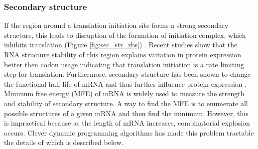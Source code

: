 \subsubsection{Secondary structure}
If the region around a translation initiation site forms a strong secondary structure, this leads to disruption of the formation of initiation complex, which inhibits translation (Figure \ref{fig:sec_str_rbs}) \cite{Kudla2009-tl, Espah_Borujeni2014-vy, Tuller2015-ts}. Recent studies show that the RNA structure stability of this region explains variation in protein expression better then codon usage \cite{Kudla2009-tl, Plotkin2011-ak, Cambray2018-kn} indicating that translation initiation is a rate limiting step for translation. Furthermore, secondary structure has been shown to change the functional half-life of mRNA and thus further influence protein expression \cite{mauger2019mrna}. Minimum free energy (MFE) of mRNA is widely used to measure the strength and stability of secondary structure. A way to find the MFE is to enumerate all possible structures of a given mRNA and then find the minimum. However, this is impractical because as the length of mRNA increases, combinatorial explosion occurs. Clever dynamic programming algorithms has made this problem tractable the details of which is described below.


